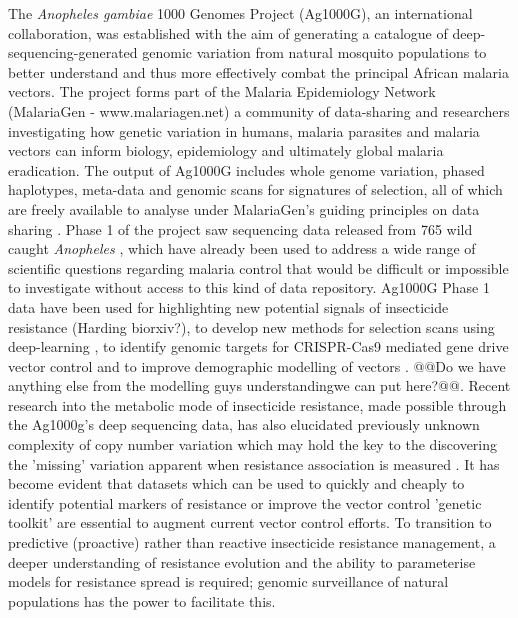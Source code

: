 \documentclass[a4paper,11pt,abstracton,hidelinks]{scrartcl}
\begin{document}
The \textit{Anopheles gambiae} 1000 Genomes Project (Ag1000G), an international collaboration, was established with the aim of generating a catalogue of deep-sequencing-generated genomic variation from natural mosquito populations to better understand and thus more effectively combat the principal African malaria vectors. 
%
The project forms part of the Malaria Epidemiology Network (MalariaGen - www.malariagen.net) a community of data-sharing and researchers investigating how genetic variation in humans, malaria parasites and malaria vectors can inform biology, epidemiology and ultimately global malaria eradication.
%
The output of Ag1000G includes whole genome variation, phased haplotypes, meta-data and genomic scans for signatures of selection, all of which are freely available to analyse under MalariaGen's guiding principles on data sharing \cite{network2008, chokshi2006, parker2009}.
%
Phase 1 of the project saw sequencing data released from 765 wild caught \textit{Anopheles} \cite{Ag1000gConsortium2017}, which have already been used to address a wide range of scientific questions regarding malaria control that would be difficult or impossible to investigate without access to this kind of data repository.
%
Ag1000G Phase 1 data have been used for highlighting new potential signals of insecticide resistance (Harding biorxiv?), to develop new methods for selection scans using deep-learning \cite{xue2019}, to identify genomic targets for CRISPR-Cas9 mediated gene drive vector control \cite{kyrou2018} and to improve demographic modelling of vectors \cite{khatri2018}.
%
@@Do we have anything else from the modelling guys understandingwe can put here?@@.
%
Recent research into the metabolic mode of insecticide resistance, made possible through the Ag1000g's deep sequencing data, has also elucidated previously unknown complexity of copy number variation which may hold the key to the discovering the 'missing' variation apparent when resistance association is measured \cite{lucas2019, mitchell2014}.
%
It has become evident that datasets which can be used to quickly and cheaply to identify potential markers of resistance or improve the vector control 'genetic toolkit' are essential to augment current vector control efforts.
%
To transition to predictive (proactive) rather than reactive insecticide resistance management, a deeper understanding of resistance evolution and the ability to parameterise models for resistance spread is required; genomic surveillance of natural populations has the power to facilitate this.
\end{document}
